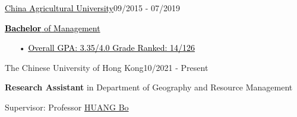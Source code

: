 \documentclass{joel_cv}
\begin{document}
\begin{sectionContentSimple}{\href{http://www.cau.edu.cn/}{\textcolor{black}{China Agricultural University}}}{09/2015 - 07/2019}
	\item \href{https://zhu-sk.github.io/Certificates_EN_2Pages.pdf}{\textcolor{black}{\textbf{Bachelor} of Management}}
	\begin{itemize}
	\item[•] \href{https://zhu-sk.github.io/Transcript_EN_2Pages.pdf}{\textcolor{black}{Overall GPA: 3.35/4.0 \quad Grade Ranked: 14/126}}%
	\end{itemize}
\end{sectionContentSimple}
\begin{sectionContentSimple}{The Chinese University of Hong Kong}{10/2021 - Present}
	\item \textbf{Research Assistant} in Department of Geography and Resource Management
	\item Supervisor: Professor \href{https://www.grm.cuhk.edu.hk/en/profile/bhuang/}{HUANG Bo}
\end{sectionContentSimple}
\end{document}
